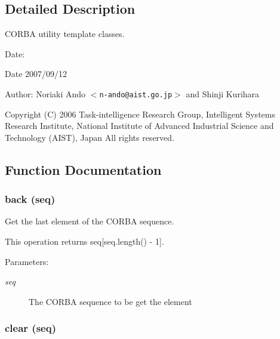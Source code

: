 \subsection{Detailed Description}
CORBA utility template classes. 

\begin{Desc}
\item[Date:]\begin{Desc}
\item[Date]2007/09/12 \end{Desc}
\end{Desc}
\begin{Desc}
\item[Author:]Noriaki Ando $<${\tt n-ando@aist.go.jp}$>$ and Shinji Kurihara\end{Desc}
Copyright (C) 2006 Task-intelligence Research Group, Intelligent Systems Research Institute, National Institute of Advanced Industrial Science and Technology (AIST), Japan All rights reserved.

\subsection{Function Documentation}
\subsubsection{\setlength{\rightskip}{0pt plus 5cm}back (seq)}\label{CORBA__SeqEx_8py_a5}


Get the last element of the CORBA sequence. 

This operation returns seq[seq.length() - 1].

\begin{Desc}
\item[Parameters:]
\begin{description}
\item[{\em seq}]The CORBA sequence to be get the element\end{description}
\end{Desc}
\subsubsection{\setlength{\rightskip}{0pt plus 5cm}clear (seq)}\label{CORBA__SeqEx_8py_a7}


